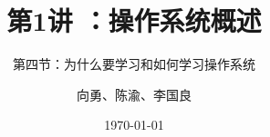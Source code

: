 


\title[第1讲]{第1讲 ：操作系统概述} %
\subtitle{第四节：为什么要学习和如何学习操作系统}
\author{向勇、陈渝、李国良} %
\date{\today} %



\begin{frame}
\titlepage %
\end{frame}

%
%

